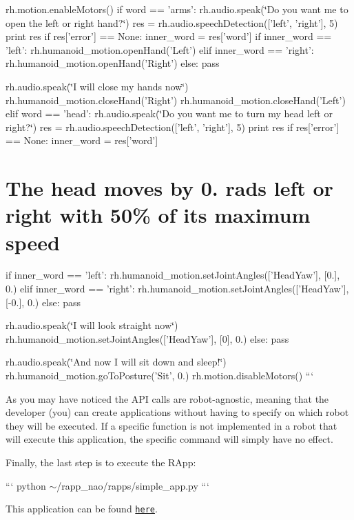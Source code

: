rh.\-motion.\-enable\-Motors() if word == 'arms'\-: rh.\-audio.\-speak(\char`\"{}\-Do you want me to open the left or right hand?\char`\"{}) res = rh.\-audio.\-speech\-Detection(\mbox{[}'left', 'right'\mbox{]}, 5) print res if res\mbox{[}'error'\mbox{]} == None\-: inner\-\_\-word = res\mbox{[}'word'\mbox{]} if inner\-\_\-word == 'left'\-: rh.\-humanoid\-\_\-motion.\-open\-Hand('Left') elif inner\-\_\-word == 'right'\-: rh.\-humanoid\-\_\-motion.\-open\-Hand('Right') else\-: pass

rh.\-audio.\-speak(\char`\"{}\-I will close my hands now\char`\"{}) rh.\-humanoid\-\_\-motion.\-close\-Hand('Right') rh.\-humanoid\-\_\-motion.\-close\-Hand('Left') elif word == 'head'\-: rh.\-audio.\-speak(\char`\"{}\-Do you want me to turn my head left or right?\char`\"{}) res = rh.\-audio.\-speech\-Detection(\mbox{[}'left', 'right'\mbox{]}, 5) print res if res\mbox{[}'error'\mbox{]} == None\-: inner\-\_\-word = res\mbox{[}'word'\mbox{]} \section*{The head moves by 0. rads left or right with 50\% of its maximum speed}

if inner\-\_\-word == 'left'\-: rh.\-humanoid\-\_\-motion.\-set\-Joint\-Angles(\mbox{[}'Head\-Yaw'\mbox{]}, \mbox{[}0.\mbox{]}, 0.) elif inner\-\_\-word == 'right'\-: rh.\-humanoid\-\_\-motion.\-set\-Joint\-Angles(\mbox{[}'Head\-Yaw'\mbox{]}, \mbox{[}-\/0.\mbox{]}, 0.) else\-: pass

rh.\-audio.\-speak(\char`\"{}\-I will look straight now\char`\"{}) rh.\-humanoid\-\_\-motion.\-set\-Joint\-Angles(\mbox{[}'Head\-Yaw'\mbox{]}, \mbox{[}0\mbox{]}, 0.) else\-: pass

rh.\-audio.\-speak(\char`\"{}\-And now I will sit down and sleep!\char`\"{}) rh.\-humanoid\-\_\-motion.\-go\-To\-Posture('Sit', 0.) rh.\-motion.\-disable\-Motors() ```

As you may have noticed the A\-P\-I calls are robot-\/agnostic, meaning that the developer (you) can create applications without having to specify on which robot they will be executed. If a specific function is not implemented in a robot that will execute this application, the specific command will simply have no effect.

Finally, the last step is to execute the R\-App\-:

``` python $\sim$/rapp\-\_\-nao/rapps/simple\-\_\-app.py ```

This application can be found \href{https://github.com/rapp-project/rapps-nao/tree/master/1.move_by_speech-easy}{\tt here}. 